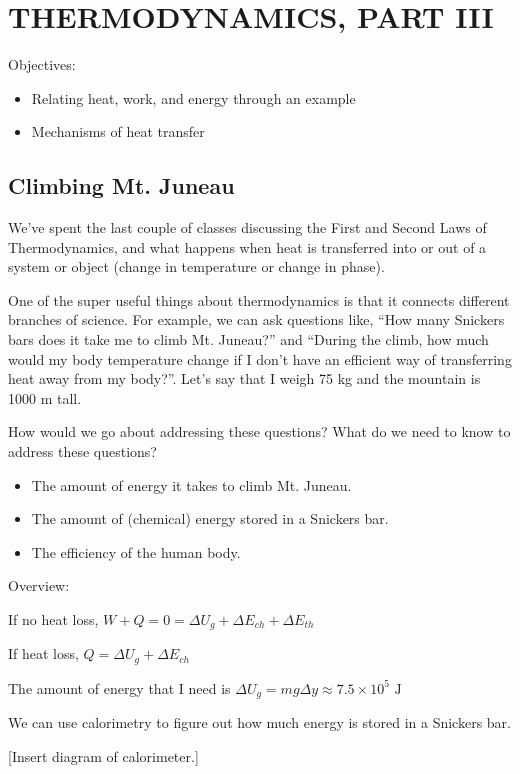 \section{THERMODYNAMICS, PART III}
Objectives:
\begin{itemize}
\item Relating heat, work, and energy through an example
\item Mechanisms of heat transfer
\end{itemize}

\hrulefill

\subsection{Climbing Mt. Juneau}
We've spent the last couple of classes discussing the First and Second Laws of Thermodynamics, and what happens when heat is transferred into or out of a system or object (change in temperature or change in phase).

One of the super useful things about thermodynamics is that it connects different branches of science. For example, we can ask questions like, ``How many Snickers bars does it take me to climb Mt. Juneau?'' and ``During the climb, how much would my body temperature change if I don't have an efficient way of transferring heat away from my body?''. Let's say that I weigh 75 kg and the mountain is 1000 m tall.

How would we go about addressing these questions? What do we need to know to address these questions?

\begin{itemize}
\item The amount of energy it takes to climb Mt. Juneau.
\item The amount of (chemical) energy stored in a Snickers bar.
\item The efficiency of the human body.
\end{itemize}

Overview:

If no heat loss, $W+Q=0=\Delta{U_g}+\Delta{E_{ch}}+\Delta{E_{th}}$

If heat loss, $Q=\Delta{U_g}+\Delta{E_{ch}}$


The amount of energy that I need is
$\Delta{U_g}=mg\Delta{y}\approx 7.5\times 10^5\mbox{ J}$

We can use calorimetry to figure out how much energy is stored in a Snickers bar.

[Insert diagram of calorimeter.]
\vspace{5cm}

